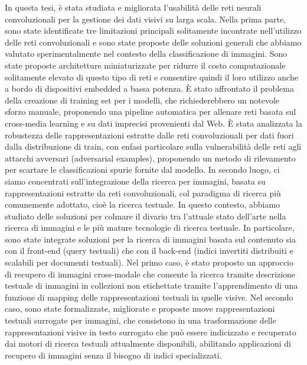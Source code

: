 In questa tesi, è stata studiata e migliorata l'usabilità delle reti neurali convoluzionali per la gestione dei dati visivi su larga scala.
Nella prima parte, sono state identificate tre limitazioni principali solitamente incontrate nell'utilizzo delle reti convoluzionali e sono state proposte delle soluzioni generali che abbiamo valutato sperimentalmente nel contesto della classificazione di immagini.
Sono state proposte architetture miniaturizzate per ridurre il costo computazionale solitamente elevato di questo tipo di reti e consentire quindi il loro utilizzo anche a bordo di dispositivi embedded a bassa potenza.
È stato affrontato il problema della creazione di training set per i modelli, che richiederebbero un notevole sforzo manuale, proponendo una pipeline automatica per allenare reti basata sul cross-media learning e su dati imprecisi provenienti dal Web.
È stata analizzata la robustezza delle rappresentazioni estratte dalle reti convoluzionali per dati fuori dalla distribuzione di train, con enfasi particolare sulla vulnerabilità delle reti agli attacchi avversari (adversarial examples), proponendo un metodo di rilevamento per scartare le classificazioni spurie fornite dal modello.
%
In secondo luogo, ci siamo concentrati sull'integrazione della ricerca per immagini, basata su rappresentazioni estratte da reti convoluzionali, col paradigma di ricerca più comunemente adottato, cioè la ricerca testuale.
In questo contesto, abbiamo studiato delle soluzioni per colmare il divario tra l'attuale stato dell'arte nella ricerca di immagini e le più mature tecnologie di ricerca testuale.
In particolare, sono state integrate soluzioni per la ricerca di immagini basata sul contenuto sia con il front-end (query testuali) che con il back-end (indici invertiti distribuiti e scalabili per documenti testuali).
Nel primo caso, è stato proposto un approccio di recupero di immagini cross-modale che consente la ricerca tramite descrizione testuale di immagini in collezioni non etichettate tramite l'apprendimento di una funzione di mapping delle rappresentazioni testuali in quelle visive.
Nel secondo caso, sono state formalizzate, migliorate e proposte nuove rappresentazioni testuali surrogate per immagini, che consistono in una trasformazione delle rappresentazioni visive in testo surrogato che può essere indicizzato e recuperato dai motori di ricerca testuali attualmente disponibili, abilitando applicazioni di recupero di immagini senza il bisogno di indici specializzati.
